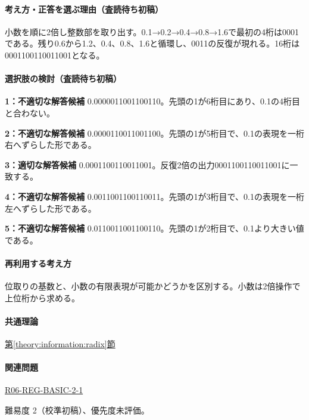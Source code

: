 \paragraph{考え方・正答を選ぶ理由（査読待ち初稿）} 小数を順に2倍し整数部を取り出す。0.1→0.2→0.4→0.8→1.6で最初の4桁は0001である。残り0.6から1.2、0.4、0.8、1.6と循環し、0011の反復が現れる。16桁は0001100110011001となる。

\paragraph{選択肢の検討（査読待ち初稿）}\mbox{}\par

\noindent\textbf{1：不適切な解答候補} 0.0000011001100110。先頭の1が6桁目にあり、0.1の4桁目と合わない。\par

\noindent\textbf{2：不適切な解答候補} 0.0000110011001100。先頭の1が5桁目で、0.1の表現を一桁右へずらした形である。\par

\noindent\textbf{3：適切な解答候補} 0.0001100110011001。反復2倍の出力0001100110011001に一致する。\par

\noindent\textbf{4：不適切な解答候補} 0.0011001100110011。先頭の1が3桁目で、0.1の表現を一桁左へずらした形である。\par

\noindent\textbf{5：不適切な解答候補} 0.0110011001100110。先頭の1が2桁目で、0.1より大きい値である。\par

\paragraph{再利用する考え方} 位取りの基数と、小数の有限表現が可能かどうかを区別する。小数は2倍操作で上位桁から求める。

\paragraph{共通理論} \hyperref[theory:information:radix]{第\ref*{theory:information:radix}節}

\paragraph{関連問題} \hyperref[q:r06-reg-basic-2-1]{R06-REG-BASIC-2-1}

\par 難易度 2（校準初稿）、優先度未評価。

